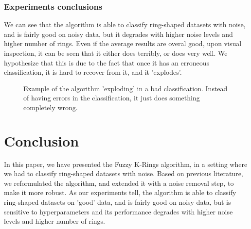 \documentclass[conference]{IEEEtran}
\begin{document}
\subsubsection{Experiments conclusions}
We can see that the algorithm is able to classify ring-shaped datasets with noise, and is fairly good on noisy data, but it degrades with higher noise levels and higher number of rings.
Even if the average results are overal good, upon visual inspection, it can be seen that it either does terribly, or does very well. We hypothesize that this is due
to the fact that once it has an erroneous classification, it is hard to recover from it, and it 'explodes'.

\begin{figure}
    \centering
    \resizebox{0.65\linewidth}{!}{}
    \label{fig:bad_class}
    \caption{Example of the algorithm 'exploding' in a bad classification. Instead of having errors in the classification, it just does something completely wrong.}
\end{figure}

\section{Conclusion}
In this paper, we have presented the Fuzzy K-Rings algorithm, in a setting where we had to classify ring-shaped datasets with noise. Based on previous literature,
we reformulated the algorithm, and extended it with a noise removal step, to make it more robust. As our experiments tell, the algorithm is able to classify ring-shaped datasets
on 'good' data, and is fairly good on noisy data, but is sensitive to hyperparameters and its performance degrades with higher noise levels and higher number of rings.




\end{document}
